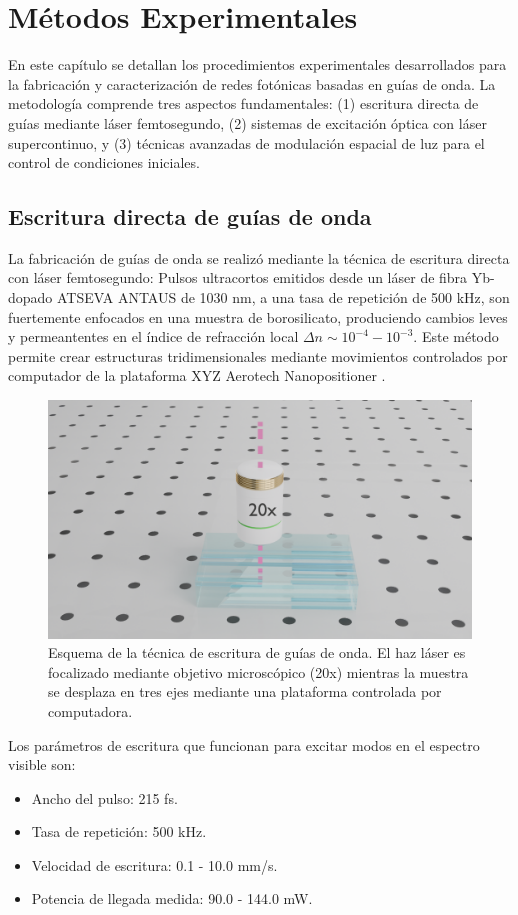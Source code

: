 \chapter{Métodos Experimentales}

En este capítulo se detallan los procedimientos experimentales desarrollados para la fabricación y caracterización de redes fotónicas basadas en guías de onda. La metodología comprende tres aspectos fundamentales: (1) escritura directa de guías mediante láser femtosegundo, (2) sistemas de excitación óptica con láser supercontinuo, y (3) técnicas avanzadas de modulación espacial de luz para el control de condiciones iniciales.


\section{Escritura directa de guías de onda \label{cap:fs}}

La fabricación de guías de onda se realizó mediante la técnica de escritura directa con láser femtosegundo: Pulsos ultracortos emitidos desde un láser de fibra Yb-dopado ATSEVA ANTAUS de 1030 nm, a una tasa de repetición de 500 kHz, son fuertemente enfocados en una muestra de borosilicato, produciendo cambios leves y permeantentes en el índice de refracción local $\Delta n \sim 10^{-4}-10^{-3}$. Este método permite crear estructuras tridimensionales mediante movimientos controlados por computador de la plataforma XYZ Aerotech Nanopositioner \citep{femto_writing}.

\begin{figure}[H]
    \centering
    \includegraphics[width=0.6\linewidth, trim={18cm 4cm 15cm 6cm},clip]{media/fabrication1}
    \caption[Esquema de la técnica de escritura de guías de onda.]{Esquema de la técnica de escritura de guías de onda. El haz láser es focalizado mediante objetivo microscópico (20x) mientras la muestra se desplaza en tres ejes mediante una plataforma controlada por computadora.}
\end{figure}

Los parámetros de escritura que funcionan para excitar modos en el espectro visible son:
\begin{itemize}
	\item Ancho del pulso: 215 fs.
    \item Tasa de repetición: 500 kHz.
    \item Velocidad de escritura: 0.1 - 10.0 mm/s.
    \item Potencia de llegada medida: 90.0 - 144.0 mW.
\end{itemize}

